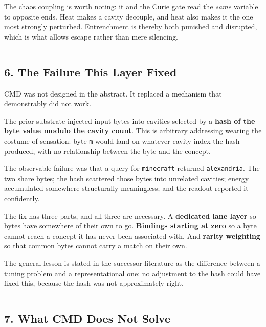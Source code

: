 \documentclass[
  11pt,
  a4paper,
]{article}
\begin{document}
The chaos coupling is worth noting: it and the Curie gate read the
\emph{same} variable to opposite ends. Heat makes a cavity decouple, and
heat also makes it the one most strongly perturbed. Entrenchment is
thereby both punished and disrupted, which is what allows escape rather
than mere silencing.

\begin{center}\rule{0.5\linewidth}{0.5pt}\end{center}

\subsection{6. The Failure This Layer
Fixed}\label{the-failure-this-layer-fixed}

CMD was not designed in the abstract. It replaced a mechanism that
demonstrably did not work.

The prior substrate injected input bytes into cavities selected by a
\textbf{hash of the byte value modulo the cavity count}. This is
arbitrary addressing wearing the costume of sensation: byte \texttt{m}
would land on whatever cavity index the hash produced, with no
relationship between the byte and the concept.

The observable failure was that a query for \texttt{minecraft} returned
\texttt{alexandria}. The two share bytes; the hash scattered those bytes
into unrelated cavities; energy accumulated somewhere structurally
meaningless; and the readout reported it confidently.

The fix has three parts, and all three are necessary. A
\textbf{dedicated lane layer} so bytes have somewhere of their own to
go. \textbf{Bindings starting at zero} so a byte cannot reach a concept
it has never been associated with. And \textbf{rarity weighting} so that
common bytes cannot carry a match on their own.

The general lesson is stated in the successor literature as the
difference between a tuning problem and a representational one: no
adjustment to the hash could have fixed this, because the hash was not
approximately right.

\begin{center}\rule{0.5\linewidth}{0.5pt}\end{center}

\subsection{7. What CMD Does Not Solve}\label{what-cmd-does-not-solve}
\end{document}
